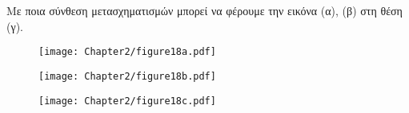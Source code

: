 \begin{exercise}
Με ποια σύνθεση μετασχηματισμών μπορεί να φέρουμε την εικόνα (α), (β) στη θέση (γ).

\begin{figure}[h!]
\begin{center}
	\begin{minipage}[b]{0.3\textwidth} 
	    \texttt{[image: Chapter2/figure18a.pdf]}
	\end{minipage}
\hfill
	\begin{minipage}[b]{0.3\textwidth} 
	    \texttt{[image: Chapter2/figure18b.pdf]}
	\end{minipage}
\hfill
	\begin{minipage}[b]{0.3\textwidth} 
	    \texttt{[image: Chapter2/figure18c.pdf]}
	\end{minipage}
\end{center}
\end{figure}

\end{exercise}

